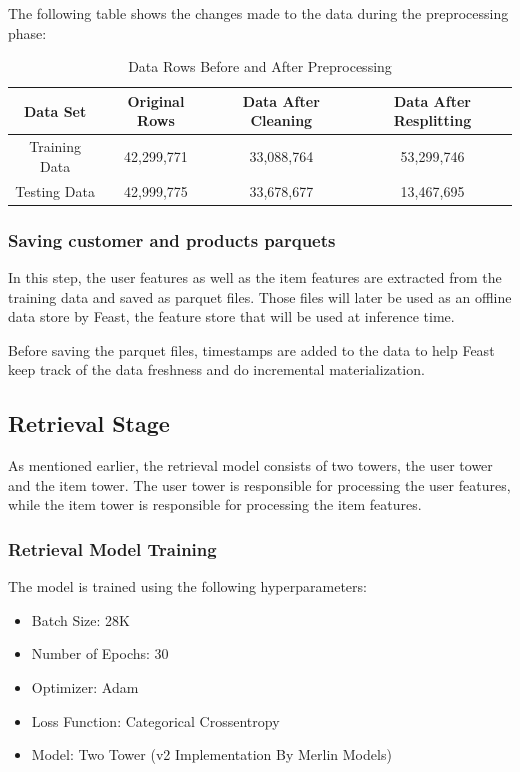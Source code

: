 The following table shows the changes made to the data during the preprocessing phase:

\begin{table}[ht]
\centering
\begin{tabular}{|c|c|c|c|}
\hline
\textbf{Data Set} & \textbf{Original Rows} & \textbf{Data After Cleaning} & \textbf{Data After Resplitting} \\
\hline
Training Data & 42,299,771 & 33,088,764 & 53,299,746 \\
\hline
Testing Data & 42,999,775 & 33,678,677 & 13,467,695 \\
\hline
\end{tabular}
\caption{Data Rows Before and After Preprocessing}
\label{tab:data-reprocessing}
\end{table}

\subsubsection{Saving customer and products parquets}

In this step, the user features as well as the item features are extracted from the training data and saved as parquet files.
Those files will later be used as an offline data store by Feast, the feature store that will be used at inference time.

Before saving the parquet files, timestamps are added to the data to help Feast keep track of the data freshness and do incremental materialization.

\subsection{Retrieval Stage}

As mentioned earlier, the retrieval model consists of two towers, the user tower and the item tower. 
The user tower is responsible for processing the user features, while the item tower is responsible for processing the item features.

\subsubsection{Retrieval Model Training}

The model is trained using the following hyperparameters:

\begin{itemize}
\item Batch Size: 28K
\item Number of Epochs: 30
\item Optimizer: Adam
\item Loss Function: Categorical Crossentropy
\item Model: Two Tower (v2 Implementation By Merlin Models)
\end{itemize}

